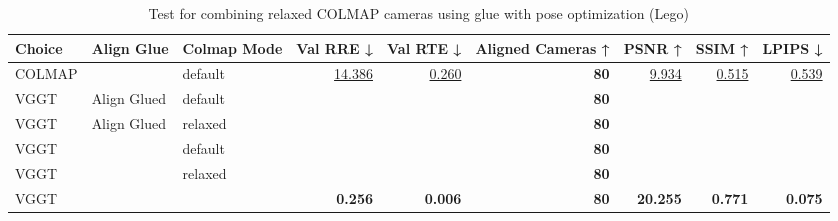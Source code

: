 \begin{table}[H]
\caption{Test for combining relaxed COLMAP cameras using glue with pose optimization (Lego)}
\label{tab:99_align_glue_relaxed_pose_opt_lego}
\begin{tabular}{lllrrrrrr}
\toprule
Choice & Align Glue & Colmap Mode & Val RRE ↓ & Val RTE ↓ & Aligned Cameras ↑ & PSNR ↑ & SSIM ↑ & LPIPS ↓ \\
\midrule
COLMAP &  & default & \underline{14.386} & \underline{0.260} & \textbf{80} & \underline{9.934} & \underline{0.515} & \underline{0.539} \\
VGGT & Align Glued & default &  &  & \textbf{80} &  &  &  \\
VGGT & Align Glued & relaxed &  &  & \textbf{80} &  &  &  \\
VGGT &  & default &  &  & \textbf{80} &  &  &  \\
VGGT &  & relaxed &  &  & \textbf{80} &  &  &  \\
VGGT &  &  & \textbf{0.256} & \textbf{0.006} & \textbf{80} & \textbf{20.255} & \textbf{0.771} & \textbf{0.075} \\
\bottomrule
\end{tabular}
\end{table}
